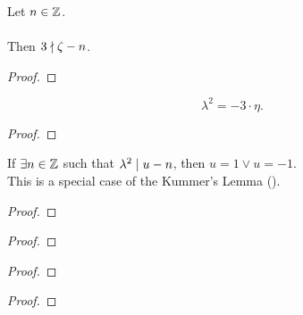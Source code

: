 \begin{theorem}
    \label{thm:not_exists_int_three_dvd_sub}
    \leanok
    Let $n \in \mathbb{Z}$. \\ \\
    Then $3 \nmid \zeta - n$.
\end{theorem}
\begin{proof}
    \leanok
\end{proof}

\begin{lemma}
    \label{lmm:lambda_sq}
    \leanok
    $$\lambda^2 = -3 \cdot \eta.$$
\end{lemma}
\begin{proof}
    \leanok
\end{proof}

\begin{theorem}
    \label{lmm:eq_one_or_neg_one_of_unit_of_congruent}
    \leanok
    If $\exists n \in \mathbb{Z}$ such that $\lambda^2 \mid u - n$, then
    $u = 1 \lor u = -1$. \\
    This is a special case of the Kummer's Lemma ().
\end{theorem}
\begin{proof}
    \leanok
\end{proof}

\begin{lemma}
    \label{lmm:norm_lambda}
    \leanok
\end{lemma}
\begin{proof}
    \leanok
\end{proof}

\begin{lemma}
    \label{lmm:norm_lambda_prime}
    \leanok
\end{lemma}
\begin{proof}
    \leanok
\end{proof}

\begin{lemma}
    \label{lmm:lambda_dvd_three}
    \leanok
\end{lemma}
\begin{proof}
    \leanok
\end{proof}

